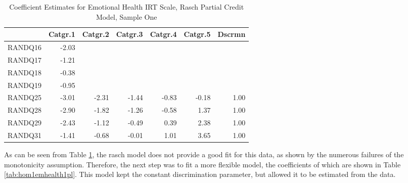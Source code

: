 \documentclass{article}
\begin{document}
\begin{table}[ht]
\centering
\begin{tabular}{rrrrrrr}
  \hline
 & Catgr.1 & Catgr.2 & Catgr.3 & Catgr.4 & Catgr.5 & Dscrmn \\ 
  \hline
RANDQ16 & -2.03 &  &  &  &  &  \\ 
  RANDQ17 & -1.21 &  &  &  &  &  \\ 
  RANDQ18 & -0.38 &  &  &  &  &  \\ 
  RANDQ19 & -0.95 &  &  &  &  &  \\ 
  RANDQ25 & -3.01 & -2.31 & -1.44 & -0.83 & -0.18 & 1.00 \\ 
  RANDQ28 & -2.90 & -1.82 & -1.26 & -0.58 & 1.37 & 1.00 \\ 
  RANDQ29 & -2.43 & -1.12 & -0.49 & 0.39 & 2.38 & 1.00 \\ 
  RANDQ31 & -1.41 & -0.68 & -0.01 & 1.01 & 3.65 & 1.00 \\ 
   \hline
\end{tabular}
\caption{Coefficient Estimates for Emotional Health IRT Scale, Rasch Partial Credit Model, Sample One} 
\label{tab:hom1emhealthrasch}
\end{table}


As can be seen from Table \ref{tab:hom1emhealthrasch}, the rasch model does not provide a good fit for this data, as shown by the numerous failures of the monotonicity assumption.  Therefore, the next step was to fit a more flexible model, the coefficients of which are shown in Table \ref{tab:hom1emhealth1pl}.  This model kept the constant discrimination parameter, but allowed it to be estimated from the data.
\end{document}
